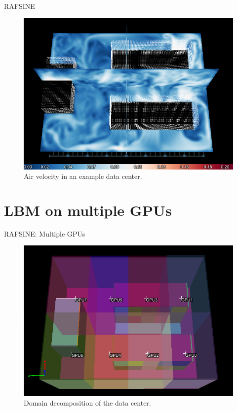 \documentclass{beamer}
\begin{document}
\begin{frame}{RAFSINE}

\begin{figure}[ht]
\begin{center}
\includegraphics[width=0.9\linewidth]{velocity_halos.png}
\end{center}
\caption{Air velocity in an example data center.}
\label{fig:problem2}
\end{figure}

\end{frame}

\section{LBM on multiple GPUs}
\begin{frame}{RAFSINE: Multiple GPUs}

\begin{figure}[ht]
\begin{center}
\includegraphics[width=0.9\linewidth]{voxels_gpus.png}
\end{center}
\caption{Domain decomposition of the data center.}
\label{fig:problem2}
\end{figure}

\end{frame}
\end{document}
